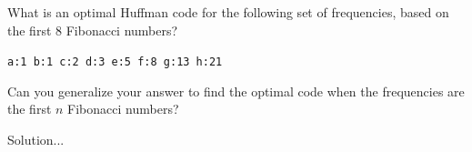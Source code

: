 \item[\textbf{Exercise 15.3-3}]
What is an optimal Huffman code for the following set of frequencies, based on
the first 8 Fibonacci numbers?

\texttt{a:1 b:1 c:2 d:3 e:5 f:8 g:13 h:21}

Can you generalize your answer to find the optimal code when the frequencies are
the first $n$ Fibonacci numbers?

\Solution

Solution...
